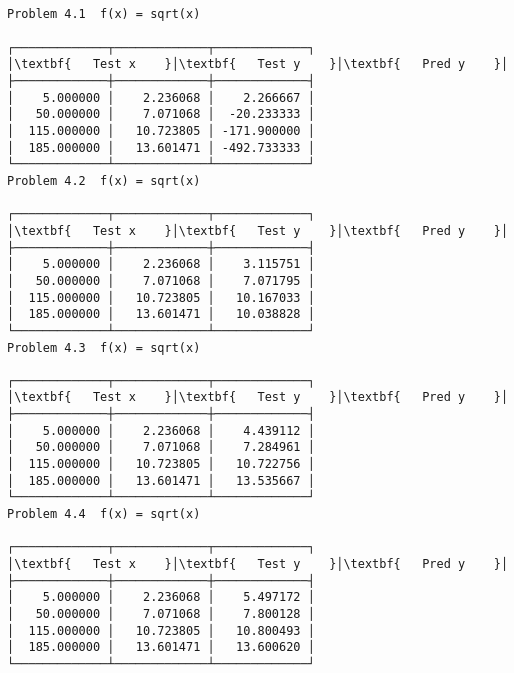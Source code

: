 \documentclass[11pt]{article}
\begin{document}
    \begin{center}
    \end{center}
    { \hspace*{\fill} \\}
    
    \begin{center}
    \end{center}
    { \hspace*{\fill} \\}
    
    \begin{center}
    \end{center}
    { \hspace*{\fill} \\}
    
    \begin{center}
    \end{center}
    { \hspace*{\fill} \\}
    
    \begin{Verbatim}[commandchars=\\\{\}]
Problem 4.1  f(x) = sqrt(x)

┌─────────────┬─────────────┬─────────────┐
│\textbf{   Test x    }│\textbf{   Test y    }│\textbf{   Pred y    }│
├─────────────┼─────────────┼─────────────┤
│    5.000000 │    2.236068 │    2.266667 │
│   50.000000 │    7.071068 │  -20.233333 │
│  115.000000 │   10.723805 │ -171.900000 │
│  185.000000 │   13.601471 │ -492.733333 │
└─────────────┴─────────────┴─────────────┘
Problem 4.2  f(x) = sqrt(x)

┌─────────────┬─────────────┬─────────────┐
│\textbf{   Test x    }│\textbf{   Test y    }│\textbf{   Pred y    }│
├─────────────┼─────────────┼─────────────┤
│    5.000000 │    2.236068 │    3.115751 │
│   50.000000 │    7.071068 │    7.071795 │
│  115.000000 │   10.723805 │   10.167033 │
│  185.000000 │   13.601471 │   10.038828 │
└─────────────┴─────────────┴─────────────┘
Problem 4.3  f(x) = sqrt(x)

┌─────────────┬─────────────┬─────────────┐
│\textbf{   Test x    }│\textbf{   Test y    }│\textbf{   Pred y    }│
├─────────────┼─────────────┼─────────────┤
│    5.000000 │    2.236068 │    4.439112 │
│   50.000000 │    7.071068 │    7.284961 │
│  115.000000 │   10.723805 │   10.722756 │
│  185.000000 │   13.601471 │   13.535667 │
└─────────────┴─────────────┴─────────────┘
Problem 4.4  f(x) = sqrt(x)

┌─────────────┬─────────────┬─────────────┐
│\textbf{   Test x    }│\textbf{   Test y    }│\textbf{   Pred y    }│
├─────────────┼─────────────┼─────────────┤
│    5.000000 │    2.236068 │    5.497172 │
│   50.000000 │    7.071068 │    7.800128 │
│  115.000000 │   10.723805 │   10.800493 │
│  185.000000 │   13.601471 │   13.600620 │
└─────────────┴─────────────┴─────────────┘
    \end{Verbatim}
\end{document}
